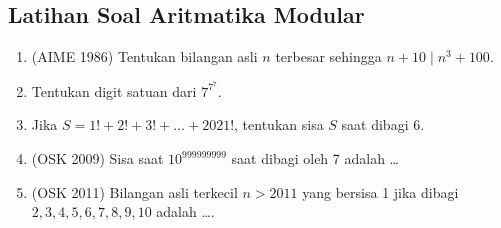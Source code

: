 \subsection{Latihan Soal Aritmatika Modular}
\begin{enumerate}    
    \item (AIME 1986) Tentukan bilangan asli $n$ terbesar sehingga $n+10 \mid n^3+100$.
    
    \item Tentukan digit satuan dari $7^{7^7}$.
    
    \item Jika $S=1!+2!+3!+\dots+2021!$, tentukan sisa $S$ saat dibagi 6.
    
    \item (OSK 2009) Sisa saat $10^{999999999}$ saat dibagi oleh 7 adalah \dots
    
    \item (OSK 2011) Bilangan asli terkecil $n>2011$ yang bersisa 1 jika dibagi $2,3,4,5,6,7,8,9,10$ adalah \dots.
\end{enumerate}